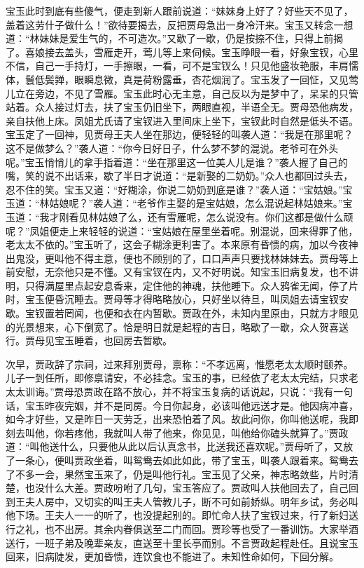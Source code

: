 \begin{parag}
    宝玉此时到底有些傻气，便走到新人跟前说道：“妹妹身上好了？好些天不见了，盖着这劳什子做什么！”欲待要揭去，反把贾母急出一身冷汗来。宝玉又转念一想道：“林妹妹是爱生气的，不可造次。”又歇了一歇，仍是按捺不住，只得上前揭了。喜娘接去盖头，雪雁走开，莺儿等上来伺候。宝玉睁眼一看，好象宝钗，心里不信，自己一手持灯，一手擦眼，一看，可不是宝钗么！只见他盛妆艳服，丰肩懦体，鬟低鬓亸，眼瞬息微，真是荷粉露垂，杏花烟润了。宝玉发了一回怔，又见莺儿立在旁边，不见了雪雁。宝玉此时心无主意，自己反以为是梦中了，呆呆的只管站着。众人接过灯去，扶了宝玉仍旧坐下，两眼直视，半语全无。贾母恐他病发，亲自扶他上床。凤姐尤氏请了宝钗进入里间床上坐下，宝钗此时自然是低头不语。宝玉定了一回神，见贾母王夫人坐在那边，便轻轻的叫袭人道：“我是在那里呢？这不是做梦么？”袭人道：“你今日好日子，什么梦不梦的混说。老爷可在外头呢。”宝玉悄悄儿的拿手指着道：“坐在那里这一位美人儿是谁？”袭人握了自己的嘴，笑的说不出话来，歇了半日才说道：“是新娶的二奶奶。”众人也都回过头去，忍不住的笑。宝玉又道：“好糊涂，你说二奶奶到底是谁？”袭人道：“宝姑娘。”宝玉道：“林姑娘呢？”袭人道：“老爷作主娶的是宝姑娘，怎么混说起林姑娘来。”宝玉道：“我才刚看见林姑娘了么，还有雪雁呢，怎么说没有。你们这都是做什么顽呢？”凤姐便走上来轻轻的说道：“宝姑娘在屋里坐着呢。别混说，回来得罪了他，老太太不依的。”宝玉听了，这会子糊涂更利害了。本来原有昏愦的病，加以今夜神出鬼没，更叫他不得主意，便也不顾别的了，口口声声只要找林妹妹去。贾母等上前安慰，无奈他只是不懂。又有宝钗在内，又不好明说。知宝玉旧病复发，也不讲明，只得满屋里点起安息香来，定住他的神魂，扶他睡下。众人鸦雀无闻，停了片时，宝玉便昏沉睡去。贾母等才得略略放心，只好坐以待旦，叫凤姐去请宝钗安歇。宝钗置若罔闻，也便和衣在内暂歇。贾政在外，未知内里原由，只就方才眼见的光景想来，心下倒宽了。恰是明日就是起程的吉日，略歇了一歇，众人贺喜送行。贾母见宝玉睡着，也回房去暂歇。
\end{parag}


\begin{parag}
    次早，贾政辞了宗祠，过来拜别贾母，禀称：“不孝远离，惟愿老太太顺时颐养。儿子一到任所，即修禀请安，不必挂念。宝玉的事，已经依了老太太完结，只求老太太训诲。”贾母恐贾政在路不放心，并不将宝玉复病的话说起，只说：“我有一句话，宝玉昨夜完姻，并不是同房。今日你起身，必该叫他远送才是。他因病冲喜，如今才好些，又是昨日一天劳乏，出来恐怕着了风。故此问你，你叫他送呢，我即刻去叫他，你若疼他，我就叫人带了他来，你见见，叫他给你磕头就算了。”贾政道：“叫他送什么，只要他从此以后认真念书，比送我还喜欢呢。”贾母听了，又放了一条心，便叫贾政坐着，叫鸳鸯去如此如此，带了宝玉，叫袭人跟着来。鸳鸯去了不多一会，果然宝玉来了，仍是叫他行礼。宝玉见了父亲，神志略敛些，片时清楚，也没什么大差。贾政吩咐了几句，宝玉答应了。贾政叫人扶他回去了，自己回到王夫人房中，又切实的叫王夫人管教儿子，断不可如前娇纵。明年乡试，务必叫他下场。王夫人一一的听了，也没提起别的。即忙命人扶了宝钗过来，行了新妇送行之礼，也不出房。其余内眷俱送至二门而回。贾珍等也受了一番训饬。大家举酒送行，一班子弟及晚辈亲友，直送至十里长亭而别。不言贾政起程赴任。且说宝玉回来，旧病陡发，更加昏愦，连饮食也不能进了。未知性命如何，下回分解。
\end{parag}
